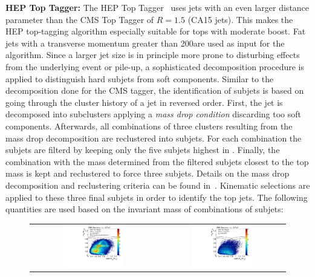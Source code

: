 \begin{description}
 \item \textbf{HEP Top Tagger:} The HEP Top Tagger~\cite{Plehn:2010st} uses jets with an even larger distance parameter than the CMS Top Tagger of $R = 1.5$ (CA15 jets). This makes the HEP top-tagging algorithm especially suitable for tops with moderate boost. Fat jets with a transverse momentum greater than 200\gev are used as input for the algorithm. Since a larger jet size is in principle more prone to disturbing effects from the underlying event or pile-up, a sophisticated decomposition procedure is applied to distinguish hard subjets from soft components. Similar to the decomposition done for the CMS tagger, the identification of subjets is based on going through the cluster history of a jet in reversed order. First, the jet is decomposed into subclusters applying a \textit{mass drop condition} discarding too soft components. Afterwards, all combinations of three clusters resulting from the mass drop decomposition are reclustered into subjets. For each combination the subjets are filterd by keeping only the five subjets highest in \pt. Finally, the combination with the mass determined from the filtered subjets closest to the top mass is kept and reclustered to force three subjets. Details on the mass drop decomposition and reclustering criteria can be found in~\cite{CMS:2014fya}. Kinematic selections are applied to these three final subjets in order to identify the top jets. The following quantities are used based on the invariant mass of combinations of subjets:
\begin{figure}[!tp]
  \centering 
  \begin{tabular}{cc}
    \includegraphics[width=0.49\textwidth]{figures/Pheno2DPlot_HTT2D_NOheptoptag_NOmasscut_hists_Signal_Add.pdf} & 
    \includegraphics[width=0.49\textwidth]{figures/Pheno2DPlot_HTT2D_NOheptoptag_NOmasscut_hists_Background_Add.pdf}

\end{tabular}
\end{figure}
\end{description}
